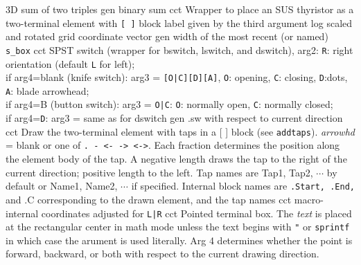 %
  {3D} {sum of two triples}%
%
  {gen}%
  {binary sum}%
%
  {cct}%
  {Wrapper to place an SUS thyristor as a two-terminal element with
   {\tt [ ]} block label given by the third argument
    }%
%
  {log}%
  {scaled and rotated grid coordinate vector}%
%
  {gen}%
  {width of the most recent (or named) {\tt s\_box}%
    }%
%
  {cct}%
  {SPST switch (wrapper for bswitch, lswitch, and dswitch),
    arg2: {\tt R}: right orientation (default {\tt L} for left);\\
     if arg4=blank (knife switch): arg3 = {\tt [O|C][D][A]},
       {\tt O}: opening, {\tt C}: closing, {\tt D}:dots,
       {\tt A}: blade arrowhead;\\
     if arg4=B (button switch): arg3 = 
       {\tt O|C}: {\tt O}: normally open, {\tt C}: normally closed;\\
     if arg4={\tt D}: arg3 = same as for dswitch }%
%
  {gen}%
  {.sw with respect to current direction}%
%
%
%
  {cct}%
  {Draw the two-terminal element with taps in a [ ] block (see
  {\tt addtaps}).
   {\sl arrowhd} = blank or one of {\tt . - <- -> <->}.  Each fraction
   determines the position along the element body of the tap.  A negative
   length draws the tap to the right of the current direction; positive
   length to the left.  Tap names are Tap1, Tap2, $\cdots$ by default
   or Name1, Name2, $\cdots$ if specified.  Internal block names are
   {\tt .Start, .End,} and {.C} corresponding to the drawn element,
   and the tap names  }%
%
  {cct}%
  {macro-internal coordinates adjusted for {\tt L|R}}%
%
  {cct}%
  {Pointed terminal box. The {\sl text} is placed at the rectangular
  center
   in math mode unless the text begins with {\tt "} or {\tt sprintf} in
   which case the arument is used literally.  Arg 4 determines whether
   the point is forward, backward, or both with respect to the current
   drawing direction.
    }%
